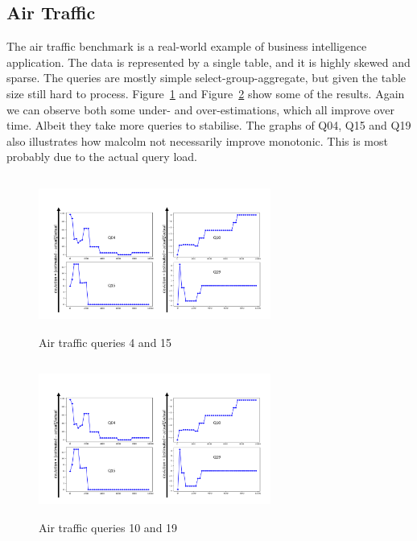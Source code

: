 \documentclass[conference]{IEEEtran}
\begin{document}
\subsection{Air Traffic}
The air traffic benchmark is a real-world example of business intelligence application.
The data is represented by a single table, and it is highly skewed and sparse.
The queries are mostly simple select-group-aggregate, but given the table size still hard to process.
Figure~\ref{fig:airtraffic-q4-q15} and Figure~\ref{fig:airtraffic-q10-q19} show some of the results.
Again we can observe both some under- and over-estimations, which all improve over time.
Albeit they take more queries to stabilise.
The graphs of Q04, Q15 and Q19 also illustrates how {\sc malcolm} not necessarily improve monotonic.
This is most probably due to the actual query load.

\begin{figure}[t!]
	\centering
	\includegraphics[height=2in,width=3in]{Figures/Q4-15.pdf}
	\caption{Air traffic queries 4 and 15
		\label{fig:airtraffic-q4-q15}}
\end{figure}

\begin{figure}[t!]
	\centering
	\includegraphics[height=2in,width=3in]{Figures/Q10-19.pdf}
	\caption{Air traffic queries 10 and 19
		\label{fig:airtraffic-q10-q19}}
\end{figure}
\end{document}
